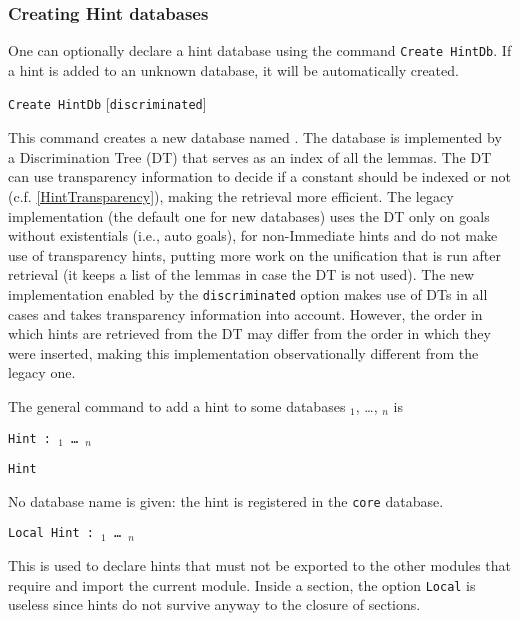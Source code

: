 \begin{coq_example*}
\subsubsection*{Creating Hint databases
  \label{CreateHintDb}}

One can optionally declare a hint database using the command
\texttt{Create HintDb}. If a hint is added to an unknown database, it
will be automatically created.

\medskip
\texttt{Create HintDb} {\ident} [\texttt{discriminated}]
\medskip

This command creates a new database named \ident.
The database is implemented by a Discrimination Tree (DT) that serves as
an index of all the lemmas. The DT can use transparency information to decide
if a constant should be indexed or not (c.f. \ref{HintTransparency}),
making the retrieval more efficient.
The legacy implementation (the default one for new databases) uses the
DT only on goals without existentials (i.e., auto goals), for non-Immediate
hints and do not make use of transparency hints, putting more work on the
unification that is run after retrieval (it keeps a list of the lemmas
in case the DT is not used). The new implementation enabled by
the {\tt discriminated} option makes use of DTs in all cases and takes
transparency information into account. However, the order in which hints
are retrieved from the DT may differ from the order in which they were
inserted, making this implementation observationally different from the
legacy one.

The general
command to add a hint to some databases \ident$_1$, \dots, \ident$_n$ is
\begin{tabbing}
  {\tt Hint {\hintdef} :~\ident$_1$ \mbox{\dots} \ident$_n$}
\end{tabbing}

\begin{Variants}
\item {\tt Hint \hintdef}

  No database name is given: the hint is registered in the {\tt core}
    database.

\item {\tt Local Hint {\hintdef} :~\ident$_1$ \mbox{\dots} \ident$_n$}

  This is used to declare hints that must not be exported to the other
  modules that require and import the current module. Inside a
  section, the option {\tt Local} is useless since hints do not
  survive anyway to the closure of sections.


\end{Variants}
\end{coq_example*}
